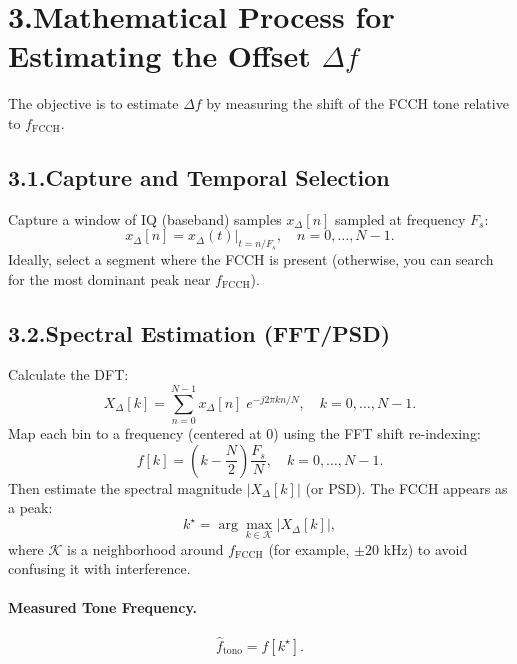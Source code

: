 \documentclass[10pt]{article}
\begin{document}
\section*{3.\;Mathematical Process for Estimating the Offset $\Delta f$}
The objective is to estimate $\Delta f$ by measuring the shift of the FCCH tone relative to $f_{\text{FCCH}}$.

\subsection*{3.1.\;Capture and Temporal Selection}
Capture a window of IQ (baseband) samples $x_\Delta[n]$ sampled at frequency $F_s$:
\begin{equation}
x_\Delta[n] = x_\Delta(t)\big|_{t=n/F_s},\quad n=0,\dots,N-1.
\end{equation}
Ideally, select a segment where the FCCH is present (otherwise, you can search for the most dominant peak near $f_{\text{FCCH}}$).

\subsection*{3.2.\;Spectral Estimation (FFT/PSD)}
Calculate the DFT:
\begin{equation}
X_\Delta[k] = \sum_{n=0}^{N-1} x_\Delta[n]\; e^{-j2\pi kn/N},\quad k=0,\dots,N-1.
\end{equation}
Map each bin to a frequency (centered at 0) using the FFT shift re-indexing:
\begin{equation}
f[k] = \left(k-\frac{N}{2}\right)\frac{F_s}{N},\quad k=0,\dots,N-1.
\end{equation}
Then estimate the spectral magnitude $\lvert X_\Delta[k]\rvert$ (or PSD). The FCCH appears as a peak:
\begin{equation}
k^\star = \arg\max_{k\in \mathcal{K}} \lvert X_\Delta[k]\rvert,
\end{equation}
where $\mathcal{K}$ is a neighborhood around $f_{\text{FCCH}}$ (for example, $\pm 20$ kHz) to avoid confusing it with interference.

\paragraph{Measured Tone Frequency.}
\begin{equation}
\hat f_{\text{tono}} = f[k^\star].
\end{equation}
\end{document}
